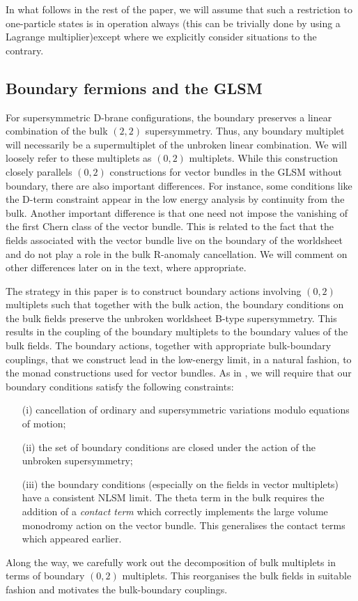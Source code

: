 \documentclass[a4paper,12pt]{article}
\begin{document}
In what follows in the rest of the paper, we will assume that such a
restriction to one-particle states is in operation always (this can be
trivially done by using a Lagrange multiplier\cite{dhoker})except
where we explicitly consider situations to the contrary.   

\subsection{Boundary fermions and the GLSM}

For supersymmetric D-brane configurations, the boundary preserves
a linear combination of the bulk $(2,2)$ supersymmetry. Thus, any
boundary multiplet will necessarily be a supermultiplet of the
unbroken linear combination. We will loosely refer to these multiplets as
 $(0,2)$ multiplets. While this construction closely parallels
$(0,2)$ constructions for vector bundles in the
GLSM without boundary\cite{zerotwo}, there are also important
differences. For instance, some conditions like the D-term constraint
appear in the low energy analysis by continuity from the bulk. Another
important difference is that one need not impose the vanishing
of the first Chern class of the vector bundle. This is related to the
fact that the fields associated with the vector bundle live on the
boundary of the worldsheet and do not play a role in the bulk R-anomaly
cancellation.  We will
comment on other differences later on in the text, where appropriate.

The strategy in this paper is to construct boundary actions involving
$(0,2)$ multiplets such that together with the bulk action, the 
boundary conditions on the bulk fields preserve the unbroken worldsheet
B-type supersymmetry. This results in the coupling of the boundary multiplets
to the boundary values of the bulk fields. The boundary actions, together
with appropriate bulk-boundary couplings, that we
construct lead in the low-energy limit, in a natural fashion,
to the monad constructions used
for vector bundles. As in \cite{lsmone}, we will
require that our boundary conditions satisfy the following constraints:
\begin{enumerate}
\item[(i)] cancellation of ordinary and supersymmetric variations 
modulo equations of motion; 
\item[(ii)] the set of boundary conditions are closed under the
action of the unbroken supersymmetry; 
\item[(iii)] the boundary conditions 
(especially on the fields in vector multiplets) have
a consistent NLSM limit. The theta term in the bulk requires the
addition of a {\em contact term} which correctly implements the large
volume monodromy action on the vector bundle. This generalises the
contact terms which appeared earlier\cite{lsmone,HIV}. 
\end{enumerate}
Along the way, we
carefully work out the decomposition of bulk multiplets in terms of
boundary $(0,2)$ multiplets. This reorganises the bulk fields
in suitable fashion and motivates the bulk-boundary couplings.
\end{document}
